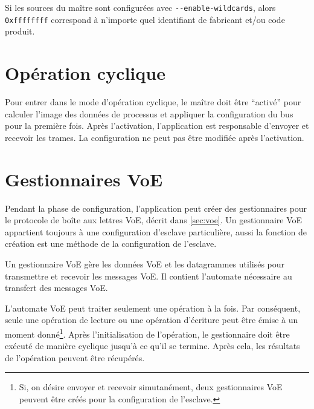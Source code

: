 \documentclass[a4paper,12pt,BCOR6mm,bibtotoc,idxtotoc]{scrbook}
\begin{document}
Si les sources du ma\^itre sont configur\'ees avec
\lstinline+--enable-wildcards+, alors
\lstinline+0xffffffff+ correspond \`a n'importe quel identifiant de fabricant et/ou code produit.


\section{Op\'eration cyclique}
\label{sec:cyclic}

Pour entrer dans le mode d'op\'eration cyclique, le ma\^itre doit \^etre
``activ\'e'' pour calculer l'image des donn\'ees de processus et appliquer
la configuration du bus pour la premi\`ere fois. Apr\`es l'activation,
l'application est responsable d'envoyer et recevoir les trames.
La configuration ne peut pas \^etre modifi\'ee apr\`es l'activation.

%


\section{Gestionnaires VoE}
\label{sec:api-voe}

Pendant la phase de configuration, l'application peut cr\'eer des
gestionnaires pour le protocole de bo\^ite aux lettres VoE, d\'ecrit
dans \autoref{sec:voe}. Un gestionnaire VoE appartient toujours \`a
une configuration d'esclave particuli\`ere, aussi la fonction de
cr\'eation est une m\'ethode de la configuration de l'esclave.

Un gestionnaire VoE g\`ere les donn\'ees VoE et les datagrammes
utilis\'es pour transmettre et recevoir les messages VoE. Il contient
l'automate n\'ecessaire au transfert des messages VoE.

L'automate VoE peut traiter seulement une op\'eration \`a la fois. Par
cons\'equent, seule une op\'eration de lecture ou une op\'eration
d'\'ecriture peut \^etre \'emise \`a un moment donn\'e\footnote{Si, on
d\'esire envoyer et recevoir simutan\'ement, deux gestionnaires VoE
peuvent \^etre cr\'e\'es pour la configuration de l'esclave.}. Apr\`es
l'initialisation de l'op\'eration, le gestionnaire doit \^etre
ex\'ecut\'e de mani\`ere cyclique jusqu'\`a ce qu'il se termine.
Apr\`es cela, les r\'esultats de l'op\'eration peuvent \^etre
r\'ecup\'er\'es.
\end{document}

